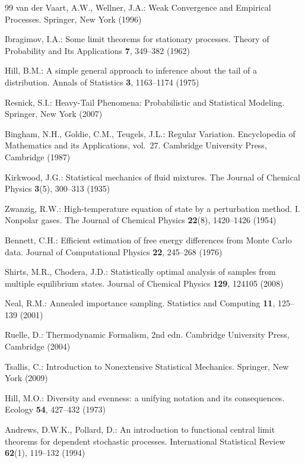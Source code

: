\documentclass[sn-mathphys-num]{sn-jnl}
\theoremstyle{thmstyleone}%
\theoremstyle{thmstyletwo}%
\theoremstyle{thmstylethree}%
\theoremstyle{thmstyleone}%
\begin{document}
\begin{thebibliography}{99}
		van der Vaart, A.W., Wellner, J.A.: Weak Convergence and Empirical
		Processes. Springer, New York (1996)
		
		Ibragimov, I.A.: Some limit theorems for stationary processes.
		Theory of Probability and Its Applications \textbf{7}, 349--382
		(1962)
		
		Hill, B.M.: A simple general approach to inference about the tail
		of a distribution. Annals of Statistics \textbf{3}, 1163--1174
		(1975)
		
		Resnick, S.I.: Heavy-Tail Phenomena: Probabilistic and Statistical
		Modeling. Springer, New York (2007)
		
		Bingham, N.H., Goldie, C.M., Teugels, J.L.: Regular Variation.
		Encyclopedia of Mathematics and its Applications, vol.~27.
		Cambridge University Press, Cambridge (1987)
		
		Kirkwood, J.G.: Statistical mechanics of fluid mixtures. The
		Journal of Chemical Physics \textbf{3}(5), 300--313 (1935)
		
		Zwanzig, R.W.: High-temperature equation of state by a
		perturbation method. I. Nonpolar gases. The Journal of Chemical
		Physics \textbf{22}(8), 1420--1426 (1954)
		
		Bennett, C.H.: Efficient estimation of free energy differences
		from Monte Carlo data. Journal of Computational Physics
		\textbf{22}, 245--268 (1976)
		
		Shirts, M.R., Chodera, J.D.: Statistically optimal analysis of
		samples from multiple equilibrium states. Journal of Chemical
		Physics \textbf{129}, 124105 (2008)
		
		Neal, R.M.: Annealed importance sampling. Statistics and Computing
		\textbf{11}, 125--139 (2001)
		
		Ruelle, D.: Thermodynamic Formalism, 2nd edn. Cambridge University
		Press, Cambridge (2004)
		
		Tsallis, C.: Introduction to Nonextensive Statistical Mechanics.
		Springer, New York (2009)
		
		Hill, M.O.: Diversity and evenness: a unifying notation and its
		consequences. Ecology \textbf{54}, 427--432 (1973)
		
		Andrews, D.W.K., Pollard, D.: An introduction to functional
		central limit theorems for dependent stochastic processes.
		International Statistical Review \textbf{62}(1), 119--132
		(1994)
		

\end{thebibliography}
\end{document}
